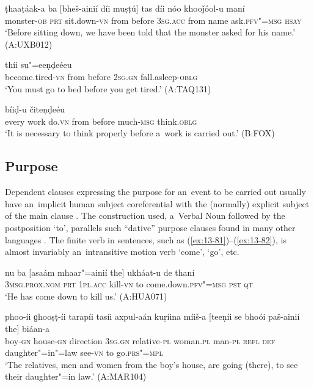 \begin{exe}
\ex
\label{ex:13-78}
\gll ṭhaaṭáak-a ba [bheš-ainií díi muṣṭú] tas díi nóo khooǰóol-u maní \\
monster-\textsc{ob} \textsc{prt} sit.down-\textsc{vn} from before \textsc{3sg.acc} from name ask.\textsc{pfv"=msg} \textsc{hsay} \\
\glt `Before sitting down, we have been told that the monster asked for his name.' (A:UXB012)

\ex
\label{ex:13-79}
 thíi su"=eeṇḍeéeu  \\
become.tired-\textsc{vn} from before \textsc{2sg.gn} fall.asleep-\textsc{oblg} \\
\glt `You must go to bed before you get tired.' (A:TAQ131)

\ex
\label{ex:13-80}
 bíiḍ-u čiteṇḍeéu  \\
every work do.\textsc{vn} from before much-\textsc{msg} think.\textsc{oblg} \\
\glt `It is necessary to think properly before a~work is carried out.' (B:FOX)
\end{exe}

\subsection{Purpose}
\label{subsec:13-4-2}

Dependent clauses expressing the purpose for an~event to be carried out usually have an~implicit human subject coreferential with the (normally) explicit subject of the main clause \citep[337]{givon2001b}. The construction used, a~Verbal Noun followed by the postposition `to', parallels such ``dative'' purpose clauses found in many other languages \citep[186--187]{thompsonlongacre1985}. The finite verb in sentences, such as (\ref{ex:13-81})--(\ref{ex:13-82}), is almost invariably an~intransitive motion verb `come', `go', etc.

\begin{exe}
\ex
\label{ex:13-81}
\gll nu ba [asaám mhaar"=ainií the] ukháat-u de thaní \\
\textsc{3msg.prox.nom} \textsc{prt} \textsc{1pl.acc} kill-\textsc{vn} to come.down.\textsc{pfv"=msg} \textsc{pst} \textsc{qt}  \\
\glt `He has come down to kill us.' (A:HUA071)

\ex
\label{ex:13-82}
\gll phoo-íi ɡhooṣṭ-íi tarapíi tasíi axpul-aán kuṛíina míiš-a [teeṇíi se bhoói paš-ainií the] biáan-a \\
boy-\textsc{gn} house-\textsc{gn} direction \textsc{3sg.gn} relative-\textsc{pl} woman.\textsc{pl}  man-\textsc{pl} \textsc{refl} \textsc{def} daughter"=in"=law see-\textsc{vn} to go.\textsc{prs"=mpl} \\
\glt `The relatives, men and women from the boy's house, are going (there), to see their daughter"=in law.' (A:MAR104) 
\end{exe}

